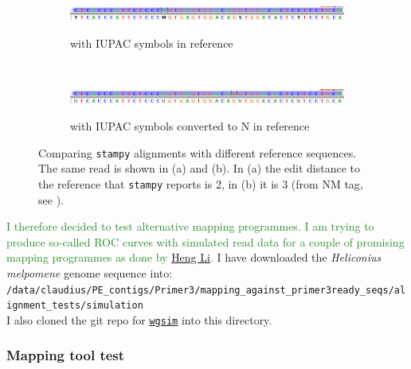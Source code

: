 \documentclass{article}\usepackage[]{graphicx}\usepackage[]{color}
\newcommand{\roger}[1]{ \textcolor[named]{ForestGreen}{#1} }
\begin{document}
\begin{figure}
\centering
\begin{subfigure}[b]{.9\textwidth}
\caption{with IUPAC symbols in reference}
\includegraphics[width=\textwidth]{./figure/stampy_align_test_IUPAC_ref}
\label{IUPAC_ref}
\end{subfigure}
~
\begin{subfigure}[b]{.9\textwidth}
\caption{with IUPAC symbols converted to N in reference}
\includegraphics[width=\textwidth]{./figure/stampy_align_test_IUPAC_to_N_ref}
\label{IUPAC_to_N_ref}
\end{subfigure}
\caption{Comparing \texttt{stampy} alignments with different reference sequences. The same read is shown in (a) and (b). In (a) the edit distance to the reference that \texttt{stampy} reports is 2, in (b) it is 3 (from NM tag, see \citealt{SAMformatSpec2011}).}
\label{stampy_align_test}
\end{figure}

\roger{I therefore decided to test alternative mapping programmes. I am trying to produce so-called ROC curves with simulated read data for a couple of promising mapping programmes as done by \href{http://lh3lh3.users.sourceforge.net/alnROC.shtml}{Heng Li}. } I have downloaded the \textit{Heliconius melpomene} genome sequence into: \\

{\footnotesize{\texttt{/data/claudius/PE\_contigs/Primer3/mapping\_against\_primer3ready\_seqs/alignment\_tests/simulation}}} \\

I also cloned the git repo for \href{https://github.com/lh3/wgsim}{\texttt{wgsim}} into this directory. 

\subsubsection{Mapping tool test}
\end{document}

